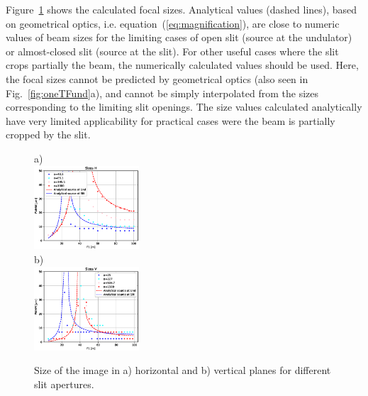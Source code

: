 \documentclass[9pt,twocolumn,twoside]{osajnl}
\begin{document}






Figure~\ref{fig:focalSizes} shows the calculated focal sizes. Analytical values (dashed lines), based on geometrical optics, i.e. equation~(\ref{eq:magnification}), are close to numeric values of beam sizes for the limiting cases of open slit (source at the undulator) or almost-closed slit (source at the slit). For other useful cases where the slit crops partially the beam, the numerically calculated values should be used. Here, the focal sizes cannot be predicted by geometrical optics (also seen in Fig.~\ref{fig:oneTFund}a), and cannot be simply interpolated from the sizes corresponding to the limiting slit openings. The size values calculated analytically have very limited applicability for practical cases were the beam is partially cropped by the slit. 




\begin{figure}[H]
a)\\
    \includegraphics[width=0.35\textwidth]{figures/sizes_h.eps}\\
b)\\
    \includegraphics[width=0.35\textwidth]{figures/sizes_v.eps}

    \caption{
    \label{fig:focalSizes}
    Size of the image in a) horizontal and b) vertical planes for different slit apertures.
    }
\end{figure}
\end{document}
